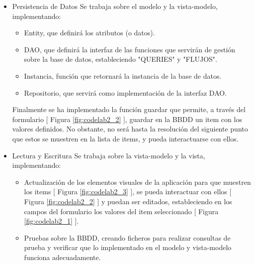 \documentclass{article}
\begin{document}
        \begin{itemize}
            \item Persistencia de Datos
            Se trabaja sobre el modelo y la vista-modelo, implementando:
            \begin{itemize}
                \item Entity, que definirá los atributos (o datos).
                \item DAO, que definirá la interfaz de las funciones que servirán de
                        gestión sobre la base de datos, estableciendo "QUERIES" y "FLUJOS".
                \item Instancia, función que retornará la instancia de la base de datos.
                \item Repositorio, que servirá como implementación de la interfaz DAO.
            \end{itemize}
            Finalmente se ha implementado la función guardar que permite, a través del formulario [ Figura \ref{fig:codelab2_2} ],
             guardar en la BBDD un item con los valores definidos. No obstante, no será hasta la resolución
             del siguiente punto que estos se muestren en la lista de items, y pueda interactuarse con ellos.
            \item Lectura y Escritura
            Se trabaja sobre la vista-modelo y la vista, implementando:
            \begin{itemize}
                \item Actualización de los elementos visuales de la aplicación para que muestren los
                       items [ Figura \ref{fig:codelab2_3} ], se pueda interactuar con ellos [ Figura \ref{fig:codelab2_2} ]
                       y puedan ser editados, estableciendo en los campos del formulario los valores del item
                       seleccionado [ Figura \ref{fig:codelab2_1} ].
                \item Pruebas sobre la BBDD, creando ficheros para realizar consultas de prueba y verificar que
                       lo implementado en el modelo y vista-modelo funciona adecuadamente.
            \end{itemize}
        \end{itemize}
\end{document}
